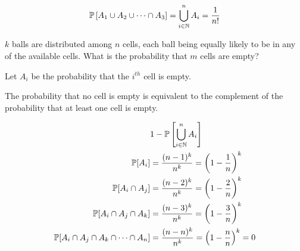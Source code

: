 

$$\mathbb P \left[ A_1 \cup A_2 \cup \cdots \cap A_3 \right] = \bigcup_{i \in \mathbb N}^n A_i =
\frac{1}{n!}$$


$k$ balls are distributed among $n$ cells, each ball being equally likely to be in any of the
available cells. What is the probability that $m$ cells are empty?

Let $A_i$ be the probability that the $i^{th}$ cell is empty.

The probability that no cell is empty is equivalent to the complement of the probability that at
least one cell is empty.

\begin{align*}
	&1 - \mathbb P\left[\bigcup_{i \in \mathbb N}^n A_i\right]\\
	\mathbb P[A_i] &= \frac{(n-1)^k}{n^k} = \left(1 - \frac{1}{n}\right)^k\\
	\mathbb P[A_i \cap A_j] &= \frac{(n-2)^k}{n^k} = \left(1 - \frac{2}{n}\right)^k\\
	\mathbb P[A_i \cap A_j \cap A_k] &= \frac{(n-3)^k}{n^k} = \left(1 - \frac{3}{n}\right)^k\\
	\mathbb P[A_i \cap A_j \cap A_k \cap \cdots \cap A_n ] &= \frac{(n-n)^k}{n^k} = \left(1 -
	\frac{n}{n}\right)^k = 0\\
\end{align*}


